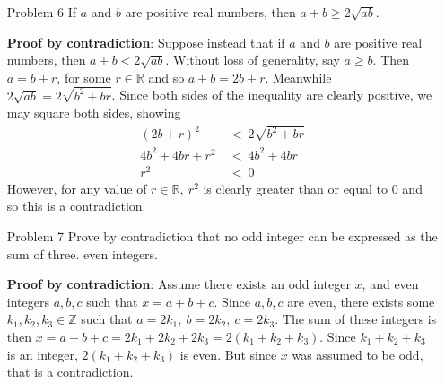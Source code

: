 \documentclass[12pt, oneside]{article}
\newcommand{\Reals}{\mathbb{R}}
\newcommand{\Integers}{\mathbb{Z}}
\newcommand{\aandb}{\(a\) and \(b\)}
\begin{document}
\begin{itemize}
    \item[Problem 6] If \aandb{} are positive real numbers, then \(a + b \geq 2\sqrt{ab}\).

          \textbf{Proof by contradiction}: Suppose instead that if \aandb{} are positive real numbers, then \(a + b < 2\sqrt{ab}\). Without loss of generality, say \(a \geq b\). Then \(a = b + r\), for some \( r \in \Reals\) and so \(a + b = 2b + r\). Meanwhile \(2\sqrt{ab} = 2\sqrt{b^2 + br}\). Since both sides of the inequality are clearly positive, we may square both sides, showing
          \begin{equation*}
              \begin{split}
                  {(2b +r)}^2     \  & <\ 2\sqrt{b^2 + br} \\
                  4b^2 + 4br + r^2\  & <\ 4b^2 + 4br       \\
                  r^2\               & <\ 0
              \end{split}
          \end{equation*}
          However, for any value of \(r \in \Reals,\ r^2\) is clearly greater than or equal to 0 and so this is a contradiction.

    \item[Problem 7] Prove by contradiction that no odd integer can be expressed as the sum of three.
          even integers.

          \textbf{Proof by contradiction}: Assume there exists an odd integer \(x\), and even integers \(a, b, c\) such that \(x = a + b +c\). Since \(a, b,c\) are even, there exists some \(k_1, k_2, k_3 \in \Integers\) such that \(a = 2k_1,\ b=2k_2,\ c=2k_3\). The sum of these integers is then \(x = a + b + c = 2k_1 + 2k_2 + 2k_3 = 2(k_1 + k_2 + k_3)\). Since \(k_1+ k_2+ k_3\) is an integer, \(2(k_1+ k_2+ k_3)\) is even. But since \(x\) was assumed to be odd, that is a contradiction.
\end{itemize}
\end{document}
